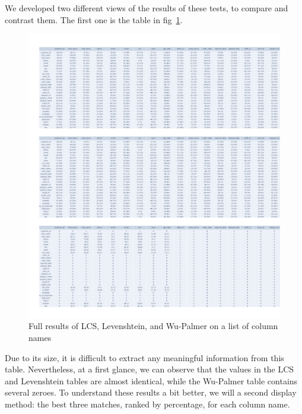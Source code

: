 \bigbreak

We developed two different views of the results of these tests, to compare and contrast them.
The first one is the table in fig~\ref{fig:lcs_levenshtein_wupalmer_results}.

\begin{figure}[h]
    \centering
    \includegraphics[width=12cm]{figures/names_lcs_levenshtein_wordnet_table}
    \caption{Full results of LCS, Levenshtein, and Wu-Palmer on a list of column names}
    \label{fig:lcs_levenshtein_wupalmer_results}
\end{figure}

Due to its size, it is difficult to extract any meaningful information from this table.
Nevertheless, at a first glance, we can observe that the values in the LCS and Levenshtein tables are almost identical,
while the Wu-Palmer table contains several zeroes.
To understand these results a bit better, we will a second display method: the best three matches, ranked by percentage,
for each column name.

